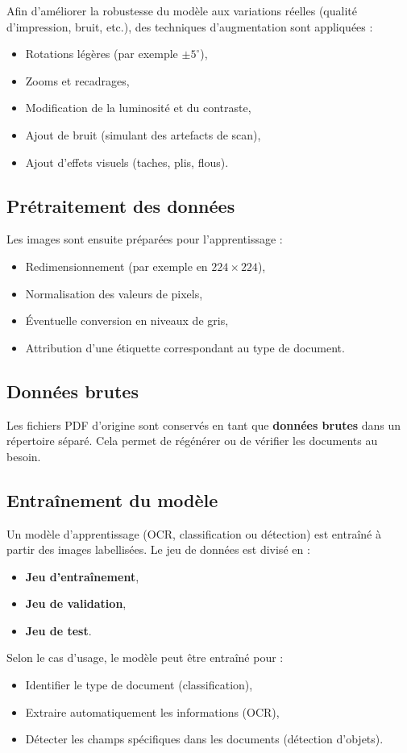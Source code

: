 \documentclass[11pt,a4paper]{article}
\begin{document}
Afin d'améliorer la robustesse du modèle aux variations réelles (qualité d'impression, bruit, etc.), des techniques d'augmentation sont appliquées :
\begin{itemize}
    \item Rotations légères (par exemple $\pm 5^\circ$),
    \item Zooms et recadrages,
    \item Modification de la luminosité et du contraste,
    \item Ajout de bruit (simulant des artefacts de scan),
    \item Ajout d'effets visuels (taches, plis, flous).
\end{itemize}

\subsection{Prétraitement des données}

Les images sont ensuite préparées pour l'apprentissage :
\begin{itemize}
    \item Redimensionnement (par exemple en $224 \times 224$),
    \item Normalisation des valeurs de pixels,
    \item Éventuelle conversion en niveaux de gris,
    \item Attribution d'une étiquette correspondant au type de document.
\end{itemize}

\subsection{Données brutes}

Les fichiers PDF d'origine sont conservés en tant que \textbf{données brutes} dans un répertoire séparé. Cela permet de régénérer ou de vérifier les documents au besoin.

\subsection{Entraînement du modèle}

Un modèle d'apprentissage (OCR, classification ou détection) est entraîné à partir des images labellisées. Le jeu de données est divisé en :
\begin{itemize}
    \item \textbf{Jeu d'entraînement},
    \item \textbf{Jeu de validation},
    \item \textbf{Jeu de test}.
\end{itemize}

Selon le cas d'usage, le modèle peut être entraîné pour :
\begin{itemize}
    \item Identifier le type de document (classification),
    \item Extraire automatiquement les informations (OCR),
    \item Détecter les champs spécifiques dans les documents (détection d'objets).
\end{itemize}
\end{document}
